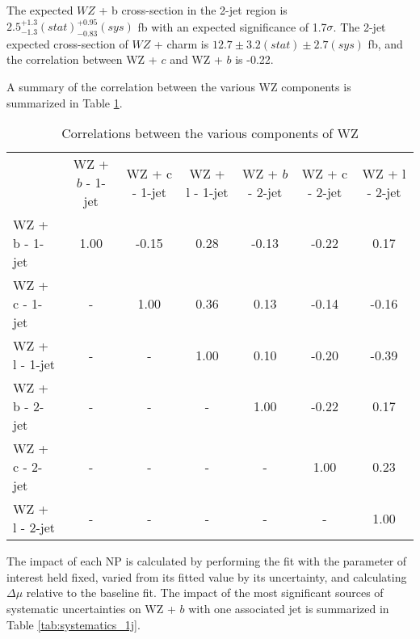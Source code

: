 The expected $WZ$ + b cross-section in the 2-jet region is $2.5^{+1.3}_{-1.3}(stat)^{+0.95}_{-0.83}(sys)$ fb with an expected significance of 1.7$\sigma$. The 2-jet expected cross-section of $WZ$ + charm is $12.7 \pm 3.2 (stat) \pm 2.7 (sys)$ fb, and the correlation between WZ + $c$ and WZ + $b$ is -0.22. 

A summary of the correlation between the various WZ components is summarized in Table \ref{tab:WZ_corr}.

\hspace{-1in}\begin{table}[H]
\begin{adjustwidth}{-3em}{-3em}
\begin{center}
\begin{tabular}{l|cccccc}
\hline
 & WZ + $b$ - 1-jet & WZ + c - 1-jet & WZ + l - 1-jet & WZ + $b$ - 2-jet & WZ + c - 2-jet & WZ + l - 2-jet\\
WZ + b - 1-jet & 1.00 & -0.15 & 0.28 & -0.13 & -0.22 & 0.17 \\
WZ + c - 1-jet & - & 1.00 & 0.36 & 0.13 & -0.14 & -0.16 \\
WZ + l - 1-jet & - & - & 1.00 & 0.10 & -0.20 & -0.39 \\
WZ + b - 2-jet & - & - & - & 1.00 & -0.22 & 0.17 \\
WZ + c - 2-jet & - & - & - & - & 1.00 & 0.23 \\
WZ + l - 2-jet & - & - & - & - & - & 1.00 \\
\hline
\end{tabular}
\caption{Correlations between the various components of WZ}
\label{tab:WZ_corr}
\end{center}
\end{adjustwidth}
\end{table}

The impact of each NP is calculated by performing the fit with the parameter of interest held fixed, varied from its fitted value by its uncertainty, and calculating $\Delta\mu$ relative to the baseline fit.  The impact of the most significant sources of systematic uncertainties on WZ + $b$ with one associated jet is summarized in Table \ref{tab:systematics_1j}. 

